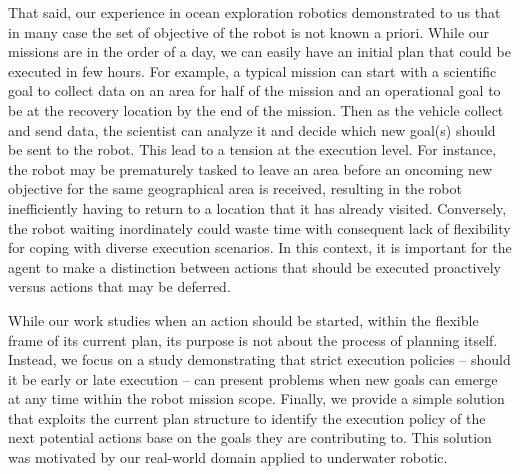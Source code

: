That said, our experience in ocean exploration robotics demonstrated to
us that in many case the set of objective of the robot is not known a
priori. While our missions are in the order of a day, we can easily
have an initial plan that could be executed in few hours. For example, 
a typical mission can start with a scientific goal to collect data on
an area for half of the mission and an operational goal to be at the
recovery location by the end of the mission. Then as the vehicle
collect and send data, the scientist can analyze it and decide which
new goal(s) should be sent to the robot. This lead to a tension at the
execution level.
 For instance, the robot may be prematurely tasked to leave an
area before an oncoming new objective for the same geographical area
is received, resulting in the robot inefficiently having to return to a
location that it has already visited. Conversely, the robot waiting
inordinately could waste time with consequent lack of flexibility for
coping with diverse execution scenarios. In this context, it is
important for the agent to make a distinction between actions that should
be executed proactively versus actions that may be deferred. 


While our work studies when an action should be started, within the
flexible frame of its current plan, its purpose is not about the
process of planning itself. Instead, we focus on a study demonstrating
that strict execution policies -- should it be early or late execution
-- can present problems when new goals can emerge at any time within
the robot mission scope. Finally, we provide a simple solution that
exploits the current plan structure to identify the execution policy
of the next potential actions base on the goals they are contributing
to. This solution was motivated by our real-world domain applied to
underwater robotic.




